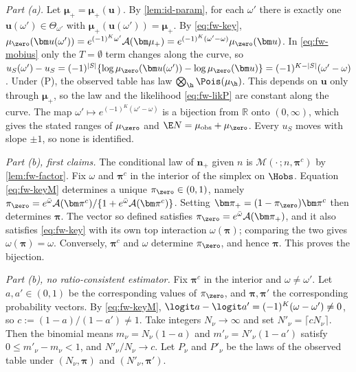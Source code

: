 \emph{Part (a).} Let $\bm\mu_+=\bm\mu_+(\bm u)$. By \cref{lem:id-param}, for each $\omega'$ there is exactly one $\bm u(\omega')\in\Theta_{\omega'}$ with $\bm\mu_+(\bm u(\omega'))=\bm\mu_+$. By \eqref{eq:fw-key}, $\mu_{\zero}(\bm u(\omega'))=e^{(-1)^K\omega'}\mathcal A(\bm\mu_+)=e^{(-1)^K(\omega'-\omega)}\mu_{\zero}(\bm u)$. In \eqref{eq:fw-mobius} only the $T=\emptyset$ term changes along the curve, so
$u_S(\omega')-u_S=(-1)^{|S|}\{\log\mu_{\zero}(\bm u(\omega'))-\log\mu_{\zero}(\bm u)\}=(-1)^{K-|S|}(\omega'-\omega)$.
Under (P), the observed table has law $\bigotimes_{\h}\Pois(\mu_{\h})$. This depends on $\bm u$ only through $\bm\mu_+$, so the law and the likelihood \eqref{eq:fw-likP} are constant along the curve. The map $\omega'\mapsto e^{(-1)^K(\omega'-\omega)}$ is a bijection from $\mathbb R$ onto $(0,\infty)$, which gives the stated ranges of $\mu_{\zero}$ and $\E N=\mu_{\mathrm{obs}}+\mu_{\zero}$. Every $u_S$ moves with slope $\pm1$, so none is identified.

\emph{Part (b), first claims.} The conditional law of $\bm n_+$ given $n$ is $\mathcal M(\cdot\,;n,\bm\pi^c)$ by \cref{lem:fw-factor}. Fix $\omega$ and $\bm\pi^c$ in the interior of the simplex on $\Hobs$. Equation \eqref{eq:fw-keyM} determines a unique $\pi_{\zero}\in(0,1)$, namely $\pi_{\zero}=e^{\bar\omega}\mathcal A(\bm\pi^c)/\{1+e^{\bar\omega}\mathcal A(\bm\pi^c)\}$. Setting $\bm\pi_+=(1-\pi_{\zero})\bm\pi^c$ then determines $\bm\pi$. The vector so defined satisfies $\pi_{\zero}=e^{\bar\omega}\mathcal A(\bm\pi_+)$, and it also satisfies \eqref{eq:fw-key} with its own top interaction $\omega(\bm\pi)$; comparing the two gives $\omega(\bm\pi)=\omega$. Conversely, $\bm\pi^c$ and $\omega$ determine $\pi_{\zero}$, and hence $\bm\pi$. This proves the bijection.

\emph{Part (b), no ratio-consistent estimator.} Fix $\bm\pi^c$ in the interior and $\omega\neq\omega'$. Let $a,a'\in(0,1)$ be the corresponding values of $\pi_{\zero}$, and $\bm\pi,\bm\pi'$ the corresponding probability vectors. By \eqref{eq:fw-keyM}, $\logit a-\logit a'=(-1)^K(\omega-\omega')\neq0$, so $c:=(1-a)/(1-a')\neq1$. Take integers $N_\nu\to\infty$ and set $N'_\nu=\lceil cN_\nu\rceil$. Then the binomial means $m_\nu=N_\nu(1-a)$ and $m'_\nu=N'_\nu(1-a')$ satisfy $0\le m'_\nu-m_\nu<1$, and $N'_\nu/N_\nu\to c$. Let $P_\nu$ and $P'_\nu$ be the laws of the observed table under $(N_\nu,\bm\pi)$ and $(N'_\nu,\bm\pi')$.

